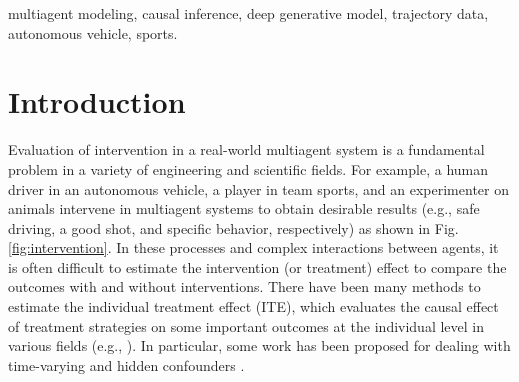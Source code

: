\documentclass[journal]{IEEEtran}
\begin{document}
\begin{IEEEkeywords}
multiagent modeling, causal inference, deep generative model, trajectory data, autonomous vehicle, sports.
\end{IEEEkeywords}






%
\IEEEpeerreviewmaketitle



\section{Introduction}
% 
% 
% 
% 
Evaluation of intervention in a real-world multiagent system is a fundamental problem in a variety of engineering and scientific fields. 
For example, a human driver in an autonomous vehicle, a player in team sports, and an experimenter on animals intervene in multiagent systems to obtain desirable results (e.g., safe driving, a good shot, and specific behavior, respectively) as shown in Fig. \ref{fig:intervention}.  
In these processes and complex interactions between agents, it is often difficult to estimate the intervention (or treatment) effect to compare the outcomes with and without interventions. 
There have been many methods to estimate the individual treatment effect (ITE), which evaluates the causal effect of treatment strategies on some important outcomes at the individual level in various fields (e.g., \cite{glass2013causal,baum2015causal,wang2015robust}).
In particular, some work has been proposed for dealing with time-varying \cite{lim2018forecasting, bica2020estimating} and hidden confounders \cite{bica2020time,liu2020estimating,ma2021deconfounding}. 
\end{document}
